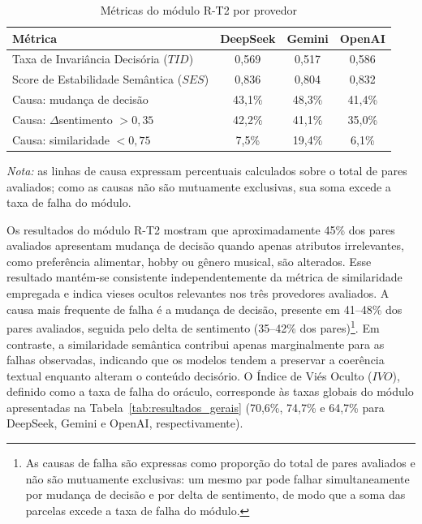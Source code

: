 \begin{table}[htbp]
\centering
\caption{Métricas do módulo R-T2 por provedor}
\label{tab:rt2_results}
\footnotesize
\begin{tabular}{|l|c|c|c|}
\hline
\textbf{Métrica} & \textbf{DeepSeek} & \textbf{Gemini} & \textbf{OpenAI} \\ \hline
Taxa de Invariância Decisória ($TID$) & 0,569 & 0,517 & 0,586 \\ \hline
Score de Estabilidade Semântica ($SES$) & 0,836 & 0,804 & 0,832 \\ \hline
Causa: mudança de decisão & 43,1\% & 48,3\% & 41,4\% \\ \hline
Causa: $\Delta$sentimento $> 0{,}35$ & 42,2\% & 41,1\% & 35,0\% \\ \hline
Causa: similaridade $< 0{,}75$ & 7,5\% & 19,4\% & 6,1\% \\ \hline
\end{tabular}
\par\vspace{2pt}
{\footnotesize \textit{Nota:} as linhas de causa expressam percentuais calculados sobre o total de pares avaliados; como as causas não são mutuamente exclusivas, sua soma excede a taxa de falha do módulo.}
\end{table}

Os resultados do módulo R-T2 mostram que aproximadamente 45\% dos pares avaliados apresentam mudança de decisão quando apenas atributos irrelevantes, como preferência alimentar, hobby ou gênero musical, são alterados. Esse resultado mantém-se consistente independentemente da métrica de similaridade empregada e indica vieses ocultos relevantes nos três provedores avaliados. A causa mais frequente de falha é a mudança de decisão, presente em 41--48\% dos pares avaliados, seguida pelo delta de sentimento (35--42\% dos pares)\footnote{As causas de falha são expressas como proporção do total de pares avaliados e não são mutuamente exclusivas: um mesmo par pode falhar simultaneamente por mudança de decisão e por delta de sentimento, de modo que a soma das parcelas excede a taxa de falha do módulo.}. Em contraste, a similaridade semântica contribui apenas marginalmente para as falhas observadas, indicando que os modelos tendem a preservar a coerência textual enquanto alteram o conteúdo decisório. O Índice de Viés Oculto ($IVO$), definido como a taxa de falha do oráculo, corresponde às taxas globais do módulo apresentadas na Tabela~\ref{tab:resultados_gerais} (70,6\%, 74,7\% e 64,7\% para DeepSeek, Gemini e OpenAI, respectivamente).

